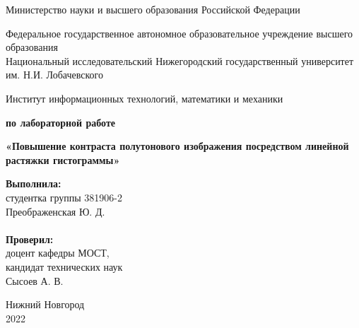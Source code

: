 \documentclass{report}
\begin{document}
\begin{titlepage}

\begin{center}
Министерство науки и высшего образования Российской Федерации
\end{center}

\begin{center}
Федеральное государственное автономное образовательное учреждение высшего образования \\
Национальный исследовательский Нижегородский государственный университет им. Н.И. Лобачевского
\end{center}

\begin{center}
Институт информационных технологий, математики и механики
\end{center}

\vspace{4em}

\begin{center}
\textbf{ по лабораторной работе} \\
\end{center}
\begin{center}
\textbf{\Large«Повышение контраста полутонового изображения посредством линейной растяжки гистограммы»} \\
\end{center}

\vspace{4em}

\newbox{\lbox}
\newlength{\maxl}
\setlength{\maxl}{\wd\lbox}
\hfill\parbox{7cm}{
\hspace*{5cm}\hspace*{-5cm}\textbf{Выполнила:} \\ студентка группы 381906-2 \\ Преображенская Ю. Д.\\
\\
\hspace*{5cm}\hspace*{-5cm}\textbf{Проверил:}\\ доцент кафедры МОСТ, \\ кандидат технических наук \\ Сысоев А. В.\\
}
\vspace{\fill}

\begin{center} Нижний Новгород \\ 2022 \end{center}

\end{titlepage}
\end{document}
